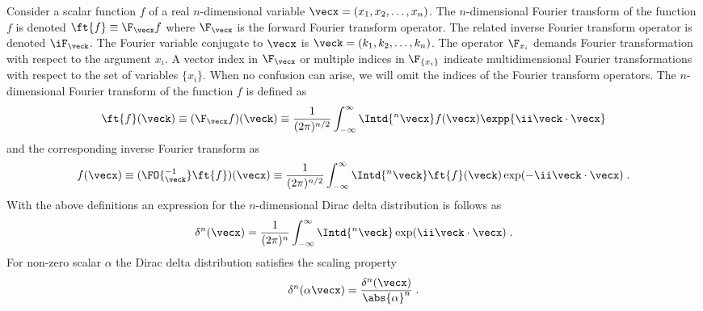 \documentclass[
twoside,
openright,
titlepage,
numbers=noenddot,
headinclude,
fleqn,
a4paper,
footinclude=true,
cleardoublepage=empty,
abstractoff,
BCOR=5mm,
paper=a4,
fontsize=11pt,
british,ngerman,american,
]{scrreprt}
\begin{document}
Consider a scalar function $f$ of a real $n$-dimensional variable
$\vecx=(x_1,x_2,\dots,x_n)$.  The $n$-dimensional Fourier transform of
the function $f$ is denoted $\ft{f}\equiv\F_\vecx f$ where $\F_\vecx$
is the forward Fourier transform operator.  The related inverse
Fourier transform operator is denoted $\iF_\veck$. The Fourier
variable conjugate to $\vecx$ is $\veck=(k_1,k_2,\dots,k_n)$.  The
operator $\F_{x_i}$ demands Fourier transformation with respect to the
argument $x_i$.  A vector index in $\F_\vecx$ or multiple indices in
$\F_{\{x_i\}}$ indicate multidimensional Fourier transformations with
respect to the set of variables $\{x_i\}$.  When no confusion can
arise, we will omit the indices of the Fourier transform operators.
The $n$-dimensional Fourier transform of the function $f$ is defined
as
\begin{equation}
  \label{eq:ft-k-n}
  \ft{f}(\veck) \equiv (\F_\vecx f)(\veck) \equiv
  \frac{1}{(2\pi)^{n/2}}\int_{-\infty}^\infty \Intd{^n\vecx} 
  f(\vecx) \expp{\ii\veck\cdot\vecx} 
\end{equation}
and the corresponding inverse Fourier transform as
\begin{equation}
  \label{eq:ift-k-n}
  f(\vecx) \equiv (\FO{^{-1}_\veck} \ft{f})(\vecx) \equiv
  \frac{1}{(2\pi)^{n/2}}\int_{-\infty}^\infty \Intd{^n\veck} 
  \ft{f}(\veck) \exp(-\ii\veck\cdot\vecx) \;.
\end{equation}
With the above definitions an expression for the $n$-dimensional Dirac
delta distribution is follows as
\begin{equation}
  \label{eq:dirac-k-n}
  \delta^n(\vecx) =
  \frac{1}{(2\pi)^n}\int_{-\infty}^\infty \Intd{^n\veck} 
   \exp(\ii\veck\cdot\vecx) \;.
\end{equation}
For non-zero scalar $\alpha$ the Dirac delta
distribution satisfies the scaling property
\begin{equation}
  \label{eq:dirac-scaling}
  \delta^n(\alpha\vecx)=\frac{\delta^n(\vecx)}{\abs{\alpha}^n} \;.
\end{equation}
\end{document}
